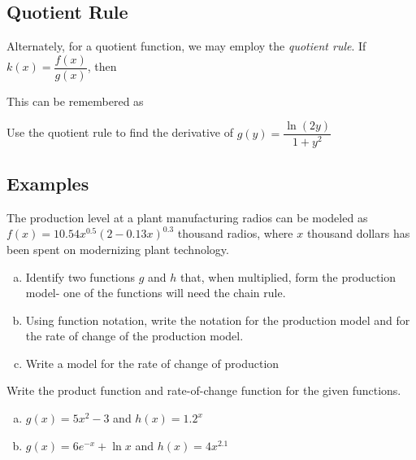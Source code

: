 \documentclass[notes]{subfiles}
\begin{document}
	\subsection*{Quotient Rule}
		Alternately, for a quotient function, we may employ the \emph{quotient rule}.  If $k(x) = \dfrac{f(x)}{g(x)}$, then
			 
		This can be remembered as
			
		\begin{ex}
			Use the quotient rule to find the derivative of $g(y)=\dfrac{\ln (2y)}{1+y^2}$  
		\end{ex}
			\newpage
			
	\subsection*{Examples}
 		\begin{ex}
 			The production level at a plant manufacturing radios can be modeled as $f(x) = 10.54x^{0.5}(2-0.13x)^{0.3}$ thousand radios, where $x$ thousand dollars has been spent on modernizing plant technology.
			\begin{enumerate}[(a)]
				\item Identify two functions $g$ and $h$ that, when multiplied, form the production model- one of the functions will need the chain rule.  
				\item Using function notation, write the notation for the production model and for the rate of change of the production model.  
 				\item Write a model for the rate of change of production  
 			\end{enumerate}
 		\end{ex}
 		
		\begin{ex}
			Write the product function and rate-of-change function for the given functions.
				\begin{enumerate}[(a)]
					\item $g(x) = 5x^2 - 3$ and $h(x) = 1.2^x$  
						\vs{1.5}
						
 					\item $g(x) = 6e^{-x}+\ln x$ and $h(x) = 4x^{2.1}$  
 						\vs{1.5}
 				\end{enumerate}
 		\end{ex}
 			\newpage
 			
\end{document}
